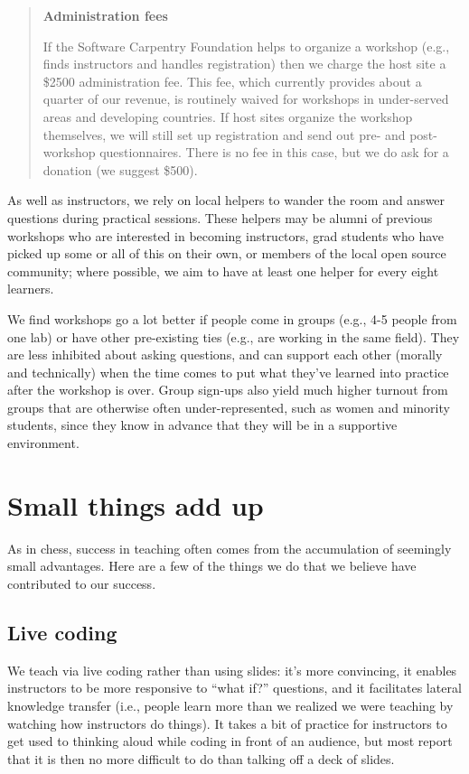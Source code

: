 \documentclass[10pt,a4paper,twocolumn]{article}
\begin{document}
\begin{quote}
\textbf{Administration fees}

If the Software Carpentry Foundation helps to organize a workshop
(e.g., finds instructors and handles registration) then we charge the
host site a \$2500 administration fee.  This fee, which currently
provides about a quarter of our revenue, is routinely waived for
workshops in under-served areas and developing countries.  If host
sites organize the workshop themselves, we will still set up
registration and send out pre- and post-workshop questionnaires.
There is no fee in this case, but we do ask for a donation (we suggest
\$500).

\end{quote}

As well as instructors, we rely on local helpers to wander the room
and answer questions during practical sessions. These helpers may be
alumni of previous workshops who are interested in becoming
instructors, grad students who have picked up some or all of this on
their own, or members of the local open source community; where
possible, we aim to have at least one helper for every eight learners.

We find workshops go a lot better if people come in groups (e.g., 4-5
people from one lab) or have other pre-existing ties (e.g., are
working in the same field). They are less inhibited about asking
questions, and can support each other (morally and technically) when
the time comes to put what they've learned into practice after the
workshop is over. Group sign-ups also yield much higher turnout from
groups that are otherwise often under-represented, such as women and
minority students, since they know in advance that they will be in a
supportive environment.

\section*{Small things add up}

As in chess, success in teaching often comes from the accumulation of
seemingly small advantages. Here are a few of the things we do that we
believe have contributed to our success.

\subsection*{Live coding}

We teach via live coding rather than using slides: it's more
convincing, it enables instructors to be more responsive to ``what
if?'' questions, and it facilitates lateral knowledge transfer (i.e.,
people learn more than we realized we were teaching by watching how
instructors do things).  It takes a bit of practice for instructors to
get used to thinking aloud while coding in front of an audience, but
most report that it is then no more difficult to do than talking off a
deck of slides.
\end{document}
